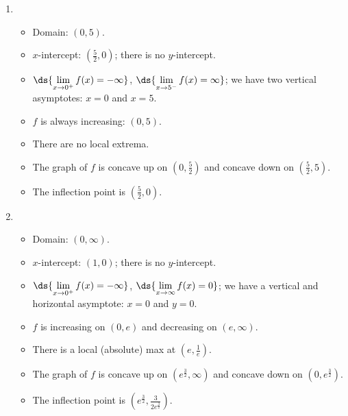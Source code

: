 \documentclass{ximera}
\begin{document}
\begin{enumerate}
\setcounter{enumi}{\value{HW}}

\addtocounter{enumi}{4}

\item  \begin{itemize}  \item  Domain:  $(0, 5)$.

\item $x$-intercept:  $\left( \frac{5}{2}, 0\right)$;  there is no $y$-intercept.

\item $\ds{\lim_{x \rightarrow 0^{+}} f(x) = -\infty}$, $\ds{\lim_{x \rightarrow 5^{-}} f(x) = \infty}$;  we have two vertical asymptotes:  $x = 0$ and $x = 5$.

\item  $f$ is always increasing: $(0, 5)$.

\item There are no local extrema.

\item  The graph of $f$ is concave up on $\left(0, \frac{5}{2}\right)$ and concave down on $\left( \frac{5}{2}, 5\right)$.

\item  The inflection point is $\left( \frac{5}{2}, 0\right)$.

\end{itemize}




\item   \begin{itemize}  \item  Domain:  $(0, \infty)$.

\item $x$-intercept:  $\left( 1 , 0\right)$;  there is no $y$-intercept.

\item $\ds{\lim_{x \rightarrow 0^{+}} f(x) = -\infty}$, $\ds{\lim_{x \rightarrow \infty} f(x) = 0}$;  we have a vertical and horizontal asymptote: $x = 0$ and  $y = 0$.

\item  $f$ is  increasing on  $(0, e)$ and decreasing on $(e, \infty)$.

\item  There is a local (absolute) max at $\left(e, \frac{1}{e}\right)$.

\item  The graph of $f$ is concave up on $\left(e^{\frac{3}{2}}, \infty \right)$ and concave down on $\left(0 ,  e^{\frac{3}{2}} \right)$.

\item  The inflection point is $\left( e^{\frac{3}{2}},  \frac{3}{2 e^{\frac{3}{2}}} \right)$.

\end{itemize}


\setcounter{HW}{\value{enumi}}
\end{enumerate}
\end{document}
